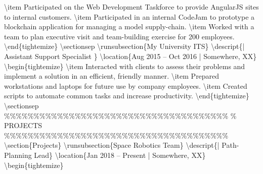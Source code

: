 \documentclass{article}%
\begin{document}
\textbackslash{}item Participated on the Web Development Taskforce to provide AngularJS sites to internal customers.\newline%
\textbackslash{}item Participated in an internal CodeJam to prototype a blockchain application for managing a model supply{-}chain.\newline%
\textbackslash{}item Worked with a team to plan executive visit and team{-}building exercise for 200 employees.\newline%
\textbackslash{}end\{tightemize\}\newline%
\textbackslash{}sectionsep\newline%
\newline%
\textbackslash{}runsubsection\{My University ITS\}\newline%
\textbackslash{}descript\{| Assistant Support Specialist \}\newline%
\textbackslash{}location\{Aug 2015 – Oct 2016 | Somewhere, XX\}\newline%
\textbackslash{}begin\{tightemize\}\newline%
\textbackslash{}item Interacted with clients to assess their problems and implement a solution in an efficient, friendly manner.\newline%
\textbackslash{}item Prepared workstations and laptops for future use by company employees.\newline%
\textbackslash{}item Created scripts to automate common tasks and increase productivity.\newline%
\textbackslash{}end\{tightemize\}\newline%
\textbackslash{}sectionsep\newline%
\newline%
\%\%\%\%\%\%\%\%\%\%\%\%\%\%\%\%\%\%\%\%\%\%\%\%\%\%\%\%\%\%\%\%\%\%\%\%\%\%\newline%
\%     PROJECTS\newline%
\%\%\%\%\%\%\%\%\%\%\%\%\%\%\%\%\%\%\%\%\%\%\%\%\%\%\%\%\%\%\%\%\%\%\%\%\%\%\newline%
\newline%
\textbackslash{}section\{Projects\}\newline%
\textbackslash{}runsubsection\{Space Robotics Team\}\newline%
\textbackslash{}descript\{| Path{-}Planning Lead\}\newline%
\textbackslash{}location\{Jan 2018 – Present | Somewhere, XX\}\newline%
\textbackslash{}begin\{tightemize\}\newline%
\end{document}
